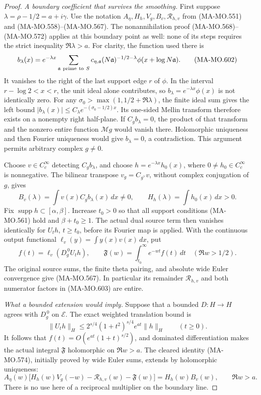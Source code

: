 \begin{proof}
\emph{A boundary coefficient that survives the smoothing.}
First suppose \(\lambda=\rho-1/2=a+i\gamma\).
Use the notation \(A_\eta,H_h,V_g,B_v,\mathcal R_{h,v}\)
from (MA-MO.551) and (MA-MO.558)--(MA-MO.567).
The nonannihilation proof (MA-MO.568)--(MA-MO.572)
applies at this boundary point as well: none of its steps
requires the strict inequality \(\Re\lambda>a\).
For clarity, the function used there is
\[
 b_\lambda(x)=e^{-\lambda x}
     \sum_{\mathfrak a\ {\rm prime\ to}\ S}
       c_{\eta,\mathfrak a}(N\mathfrak a)^{-1/2-\lambda}
                              \phi(x+\log N\mathfrak a).
 \tag{MA-MO.602}
\]
It vanishes to the right of the last support edge \(r\)
of \(\phi\). In the interval \(r-\log2<x<r\), the
unit ideal alone contributes, so
\(b_\lambda=e^{-\lambda x}\phi(x)\) is not identically
zero. For any
\(\sigma_0>\max(1,1/2+\Re\lambda)\), the finite ideal
sum gives the left bound
\(\lvert b_\lambda(x)\rvert\le
C_\lambda e^{-(\sigma_0-1/2)x}\).
Its one-sided Mellin transform therefore exists on a
nonempty right half-plane. If \(C_gb_\lambda=0\), the
product of that transform and the nonzero entire function
\(\mathcal Mg\) would vanish there. Holomorphic uniqueness
and then Fourier uniqueness would give \(b_\lambda=0\),
a contradiction. This argument permits arbitrary complex
\(g\ne0\).

Choose \(v\in C_c^\infty\) detecting \(C_gb_\lambda\),
and choose \(h=e^{-\lambda x}h_0(x)\), where
\(0\ne h_0\in C_c^\infty\) is nonnegative. The bilinear
transpose \(v_g=C_{g^\vee}v\), without complex conjugation
of \(g\), gives
\[
 B_v(\lambda)=\int v(x)C_gb_\lambda(x)\,dx\ne0,\qquad
 H_h(\lambda)=\int h_0(x)\,dx>0 .
 \tag{MA-MO.603}
\]
Fix \(\operatorname{supp}h\subset[\alpha,\beta]\).
Increase \(t_0>0\) so that all support conditions
(MA-MO.561) hold and \(\beta+t_0\ge1\).
The actual dual source term then vanishes identically
for \(U_th\), \(t\ge t_0\), before its Fourier map is
applied. With the continuous output functional
\(\ell_v(y)=\int y(x)v(x)\,dx\), put
\[
 f(t)=\ell_v(D_g^{\,0}U_th),\qquad
 \mathfrak F(w)=\int_{t_0}^{\infty}e^{-wt}f(t)\,dt
                                      \quad(\Re w>1/2).
 \tag{MA-MO.604}
\]
The original source sums, the finite theta pairing, and
absolute wide Euler convergence give (MA-MO.567).
In particular its remainder \(\mathcal R_{h,v}\) and
both numerator factors in (MA-MO.603) are entire.

\emph{What a bounded extension would imply.}
Suppose that a bounded \(D:H\to H\) agrees with
\(D_g^{\,0}\) on \(\mathcal E\).
The exact weighted translation bound is
\[
 \|U_th\|_H\le
       2^{s/4}(1+t^2)^{s/4}e^{at}\|h\|_H
                                             \qquad(t\ge0).
 \tag{MA-MO.605}
\]
It follows that \(f(t)=O(e^{at}(1+t)^{s/2})\), and
dominated differentiation makes the actual integral
\(\mathfrak F\) holomorphic on \(\Re w>a\).
The cleared identity (MA-MO.574), initially proved by
wide Euler sums, extends by holomorphic uniqueness:
\[
 A_\eta(w)\bigl[
 H_h(w)V_g(-w)-\mathcal R_{h,v}(w)-\mathfrak F(w)
                 \bigr]=H_h(w)B_v(w),\qquad \Re w>a .
 \tag{MA-MO.606}
\]
There is no use here of a reciprocal multiplier on the
boundary line.


\end{proof}
